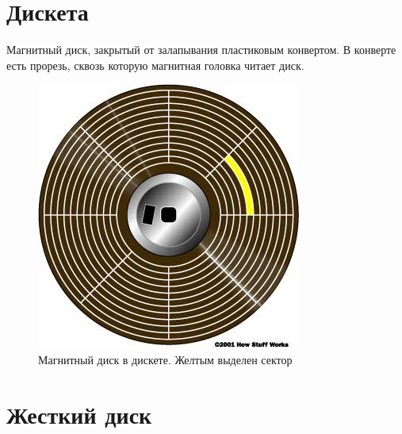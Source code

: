 \documentclass[12pt, a4paper]{article}
\begin{document}
\section{Дискета}
Магнитный диск, закрытый от залапывания пластиковым конвертом. В конверте есть прорезь, сквозь которую магнитная головка читает диск.
\begin{figure}[h]
    \includegraphics[scale=0.6]{./images/floppy-disk-track.jpg}
    \caption{Магнитный диск в дискете. Желтым выделен сектор}
    \label{fig:floppy-disk-track}
\end{figure}
\section{Жесткий диск}

\section{}
\end{document}
